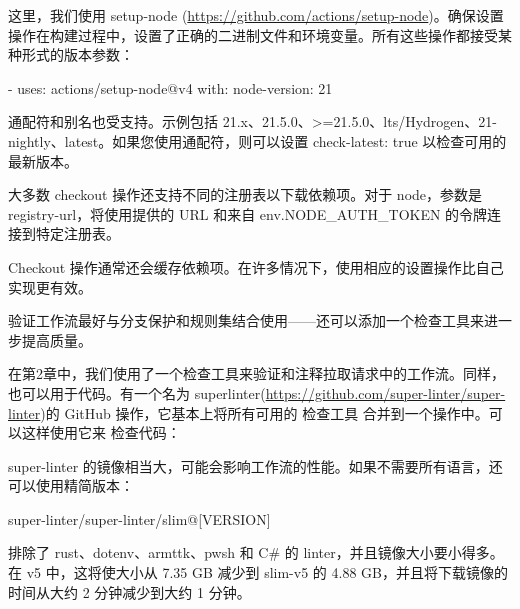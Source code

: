 这里，我们使用 setup-node (\url{https://github.com/actions/setup-node})。确保设置操作在构建过程中，设置了正确的二进制文件和环境变量。所有这些操作都接受某种形式的版本参数：

\begin{shell}
- uses: actions/setup-node@v4
  with:
    node-version: 21
\end{shell}

通配符和别名也受支持。示例包括 21.x、21.5.0、>=21.5.0、lts/Hydrogen、21-nightly、latest。如果您使用通配符，则可以设置 check-latest: true 以检查可用的最新版本。

大多数 checkout 操作还支持不同的注册表以下载依赖项。对于 node，参数是 registry-url，将使用提供的 URL 和来自 env.NODE\_AUTH\_TOKEN 的令牌连接到特定注册表。

Checkout 操作通常还会缓存依赖项。在许多情况下，使用相应的设置操作比自己实现更有效。


验证工作流最好与分支保护和规则集结合使用——还可以添加一个检查工具来进一步提高质量。


在第2章中，我们使用了一个检查工具来验证和注释拉取请求中的工作流。同样，也可以用于代码。有一个名为 superlinter(\url{https://github.com/super-linter/super-linter})的 GitHub 操作，它基本上将所有可用的 检查工具 合并到一个操作中。可以这样使用它来 检查代码：


super-linter 的镜像相当大，可能会影响工作流的性能。如果不需要所有语言，还可以使用精简版本：

\begin{shell}
super-linter/super-linter/slim@[VERSION]
\end{shell}

排除了 rust、dotenv、armttk、pwsh 和 C\# 的 linter，并且镜像大小要小得多。在 v5 中，这将使大小从 7.35 GB 减少到 slim-v5 的 4.88 GB，并且将下载镜像的时间从大约 2 分钟减少到大约 1 分钟。


